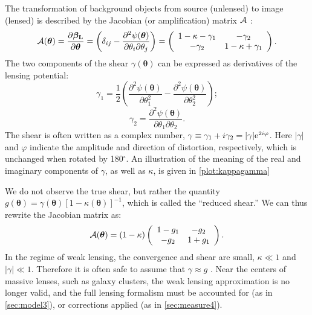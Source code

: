 The transformation of background objects from source (unlensed) to image (lensed) is described by the Jacobian (or amplification) matrix $\cal{A}$ \citep[e.g.][]{DodelsonText}: 
\begin{equation}
\label{eqn:A}
{\cal A}(\bm{\theta}) = \frac{\partial \bm{\beta_{\rm L}}}{\partial \bm{\theta}}  = \left( \delta_{ij} - \frac{\partial^2 \psi(\bm{\theta})}{\partial \theta_{i} \partial \theta_j} \right) = \left( \begin{array}{cc}
{1-\kappa-\gamma_1} & {-\gamma_2} \\
{-\gamma_2} & {1-\kappa+\gamma_1} \\
\end{array} \right). 
\end{equation}
The two components of the shear $\gamma (\bm{\theta})$ can be expressed as derivatives of the lensing potential:
\begin{equation}
\gamma_1 = \frac{1}{2} \left( \frac{\partial^2 \psi(\bm{\theta})}{\partial\theta_1^2} - \frac{\partial^2 \psi(\bm{\theta})}{\partial\theta_2^2} \right); 
\end{equation}
\begin{equation}
\gamma_2 = \frac{\partial^2 \psi(\bm{\theta})}{\partial\theta_1 \partial\theta_2}.
\end{equation}
The shear is often written as a complex number, $\gamma \equiv \gamma_1 + i\gamma_2 = |\gamma|{\rm e}^{2i\varphi}$. Here $|\gamma|$ and $\varphi$ indicate the amplitude and direction of distortion, respectively, which is unchanged when rotated by 180$^\circ$. An illustration of the meaning of the real and imaginary components of $\gamma$, as well as $\kappa$, is given in \autoref{plot:kappagamma}

We do not observe the true shear, but rather the quantity $g(\bm{\theta}) = \gamma (\bm{\theta}) \left[1-\kappa (\bm{\theta}) \right]^{-1}$, which is called the ``reduced shear.'' We can thus rewrite the Jacobian matrix as:
\begin{equation}
\label{eqn:Ag}
{\cal A}(\bm{\theta}) = (1-\kappa) \left( \begin{array}{cc}
{1-g_1} & {-g_2} \\
{-g_2} & {1+g_1} \\
\end{array} \right). 
\end{equation}
In the regime of weak lensing, the convergence and shear are small, $\kappa \ll 1$ and $| \gamma| \ll 1$. Therefore it is often safe to assume that $\gamma \approx g$ \citep{Schneider06_WeakGravLens}. Near the centers of massive lenses, such as galaxy clusters, the weak lensing approximation is no longer valid, and the full lensing formalism must be accounted for (as in \autoref{sec:model3}), or corrections applied (as in \autoref{sec:measure4}).

